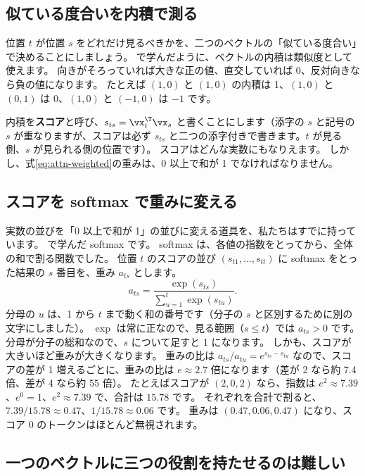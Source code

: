 \subsection*{似ている度合いを内積で測る}

位置 $t$ が位置 $s$ をどれだけ見るべきかを、二つのベクトルの「似ている度合い」で決めることにしましょう。
で学んだように、ベクトルの内積は類似度として使えます。
向きがそろっていれば大きな正の値、直交していれば 0、反対向きなら負の値になります。
たとえば $(1,0)$ と $(1,0)$ の内積は 1、$(1,0)$ と $(0,1)$ は 0、$(1,0)$ と $(-1,0)$ は $-1$ です。

内積を\textbf{スコア}と呼び、$s_{ts} = \vx_t^\T\vx_s$ と書くことにします（添字の $s$ と記号の $s$ が重なりますが、スコアは必ず $s_{ts}$ と二つの添字付きで書きます。$t$ が見る側、$s$ が見られる側の位置です）。
スコアはどんな実数にもなりえます。
しかし、式\eqref{eq:attn-weighted}の重みは、0 以上で和が 1 でなければなりません。

\subsection*{スコアを softmax で重みに変える}

実数の並びを「0 以上で和が 1」の並びに変える道具を、私たちはすでに持っています。
で学んだ softmax です。
softmax は、各値の指数をとってから、全体の和で割る関数でした。
位置 $t$ のスコアの並び $(s_{t1},\dots,s_{tt})$ に softmax をとった結果の $s$ 番目を、重み $a_{ts}$ とします。
\begin{equation}
a_{ts} = \frac{\exp(s_{ts})}{\sum_{u=1}^{t}\exp(s_{tu})} .
\label{eq:attn-softmax}
\end{equation}
分母の $u$ は、1 から $t$ まで動く和の番号です（分子の $s$ と区別するために別の文字にしました）。
$\exp$ は常に正なので、見る範囲（$s\le t$）では $a_{ts}>0$ です。
分母が分子の総和なので、$s$ について足すと 1 になります。
しかも、スコアが大きいほど重みが大きくなります。
重みの比は $a_{ts}/a_{tu}=e^{s_{ts}-s_{tu}}$ なので、スコアの差が 1 増えるごとに、重みの比は $e\approx2.7$ 倍になります（差が 2 なら約 7.4 倍、差が 4 なら約 55 倍）。
たとえばスコアが $(2, 0, 2)$ なら、指数は $e^{2}\approx 7.39$、$e^{0}=1$、$e^{2}\approx 7.39$ で、合計は $15.78$ です。
それぞれを合計で割ると、$7.39/15.78\approx0.47$、$1/15.78\approx0.06$ です。
重みは $(0.47, 0.06, 0.47)$ になり、スコア 0 のトークンはほとんど無視されます。

\subsection*{一つのベクトルに三つの役割を持たせるのは難しい}

